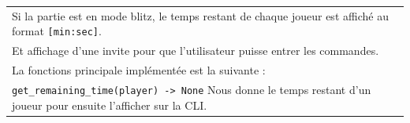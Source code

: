 \documentclass[a4paper,12pt]{article}
\begin{document}
\begin{tabularx}{\textwidth}{|X|}
    Si la partie est en mode blitz, le temps restant de chaque joueur est affiché au format \texttt{[min:sec]}.                                                                                                                                 \\
    Et affichage d’une invite pour que l’utilisateur puisse entrer les commandes.                                                                                                                                                               \\
    La fonctions principale implémentée est la suivante :                                                                                                                                                                                       \\
    \texttt{get\_remaining\_time(player) -> None} Nous donne le temps restant d’un joueur pour ensuite l’afficher sur la CLI.                                                                                                                   \\


\end{tabularx}
\end{document}

